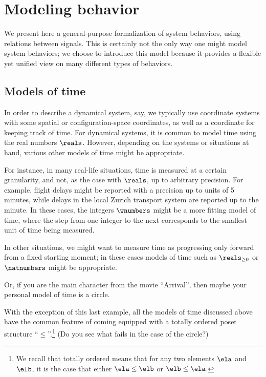 
  \section{Modeling behavior}

    We present here a general-purpose formalization of system behaviors, using relations between signals. This is certainly not the only way one might model system behaviors; we choose to introduce this model because it provides a flexible yet unified view on many different types of behaviors.  
    
\subsection{Models of time}

In order to describe a dynamical system, say, we typically use coordinate systems with some spatial or configuration-space coordinates, as well as a coordinate for keeping track of time. For dynamical systems, it is common to model time using the real numbers $\reals$. However, depending on the systems or situations at hand, various other models of time might be appropriate. 

For instance, in many real-life situations, time is measured at a certain granularity, and not, as the case with $\reals$, up to arbitrary precision. For example, flight delays might be reported with a precision up to units of 5 minutes, while delays in the local Zurich transport system are reported up to the minute. In these cases, the integers $\wnumbers$ might be a more fitting model of time, where the step from one integer to the next corresponds to the smallest unit of time being measured. 

In other situations, we might want to measure time as progressing only forward from a fixed starting moment; in these cases models of time such as $\reals_{\geq 0}$ or $\natnumbers$ might be appropriate. 

Or, if you are the main character from the movie ``Arrival'', then maybe your personal model of time is a circle. 


With the exception of this last example, all the models of time discussed above have the common feature of coming equipped with a totally ordered poset structure ``$\leq$''.\footnote{We recall that totally ordered means that for any two elements $\ela$ and $\elb$, it is the case that either $\ela \leq \elb$ or $\elb \leq \ela$.}  (Do you see what fails in the case of the circle?) 



